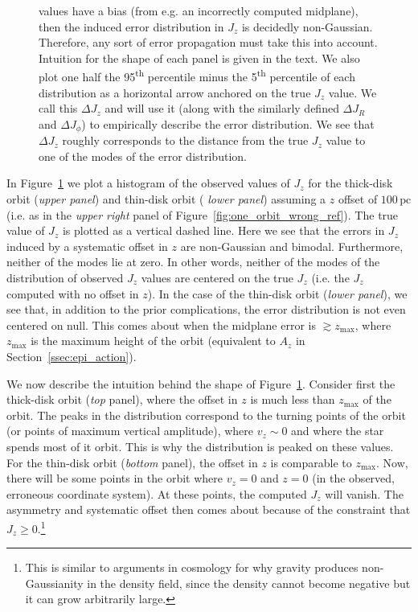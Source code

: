 \documentclass[twocolumn]{aastex62}
\newcommand{\pc}{\text{pc}}
\newcommand{\uth}{\textsuperscript{th}}
\begin{document}
\begin{figure}
{values have a bias (from e.g. an incorrectly computed midplane), then the
induced error distribution in $J_z$ is decidedly non-Gaussian. Therefore, any
sort of error propagation must take this into account. Intuition for the shape
of each panel is given in the text. We also plot one half the 95\uth{}
percentile minus the 5\uth{} percentile of each distribution as a horizontal
arrow anchored on the true $J_z$ value. We call this $\Delta J_z$ and will use
it (along with the similarly defined $\Delta J_R$ and $\Delta J_{\phi}$) to
empirically describe the error distribution. We see that $\Delta J_z$ roughly
corresponds to the distance from the true $J_z$ value to one of the modes of
the error distribution.}
\label{fig:Jz_hist}
\end{figure}

In Figure~\ref{fig:Jz_hist} we plot a histogram of the observed values of
$J_z$ for the thick-disk orbit ({\em upper panel}) and thin-disk orbit ({\em
lower panel}) assuming a $z$ offset of $100\,\pc$ (i.e. as in the {\em upper
right} panel of Figure~\ref{fig:one_orbit_wrong_ref}). The true value of $J_z$
is plotted as a vertical dashed line. Here we see that the errors in $J_z$
induced by a systematic offset in $z$ are non-Gaussian and bimodal.
Furthermore, neither of the modes lie at zero. In other words, neither of the
modes of the distribution of observed $J_z$ values are centered on the true
$J_z$ (i.e. the $J_z$ computed with no offset in $z$). In the case of the
thin-disk orbit ({\em lower panel}), we see that, in addition to the prior
complications, the error distribution is not even centered on null. This comes
about when the midplane error is $\gtrsim z_{\text{max}}$, where
$z_{\text{max}}$ is the maximum height of the orbit (equivalent to $A_z$ in
Section~\ref{ssec:epi_action}).

We now describe the intuition behind the shape of Figure~\ref{fig:Jz_hist}.
Consider first the thick-disk orbit ({\em top} panel), where the offset in $z$
is much less than $z_{\text{max}}$ of the orbit. The peaks in the distribution
correspond to the turning points of the orbit (or points of maximum vertical
amplitude), where $v_z \sim 0$ and where the star spends most of it orbit.
This is why the distribution is peaked on these values. For the thin-disk
orbit ({\em bottom} panel), the offset in $z$ is comparable to
$z_{\text{max}}$. Now, there will be some points in the orbit where $v_z = 0$
and $z=0$ (in the observed, erroneous coordinate system). At these points, the
computed $J_z$ will vanish. The asymmetry and systematic offset then comes
about because of the constraint that $J_z \geq 0$.\footnote{This is similar to
arguments in cosmology for why gravity produces non-Gaussianity in the density
field, since the density cannot become negative but it can grow arbitrarily
large.}
\end{document}
